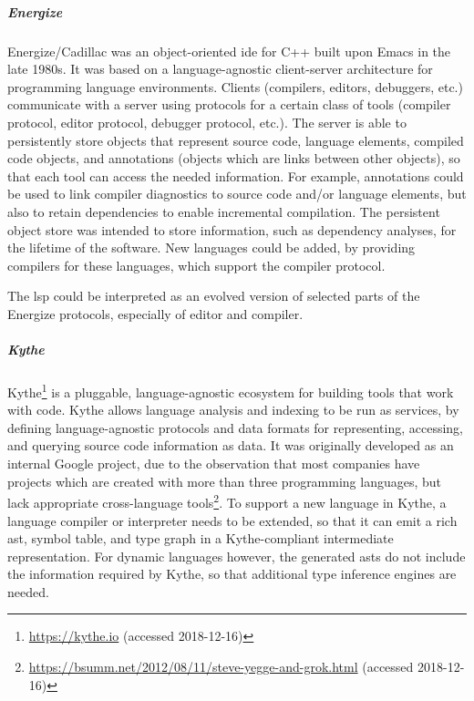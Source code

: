     
    \subparagraph{Energize}
    Energize/Cadillac \cite{gabriel1990foundation} was an object-oriented \ac{ide} for C++ built upon Emacs in the late 1980s. It was based on a language-agnostic client-server architecture for programming language environments. Clients (compilers, editors, debuggers, etc.) communicate with a server using protocols for a certain class of tools (compiler protocol, editor protocol, debugger protocol, etc.). The server is able to persistently store objects that represent source code, language elements, compiled code objects, and annotations (objects which are links between other objects), so that each tool can access the needed information. For example, annotations could be used to link compiler diagnostics to source code and/or language elements, but also to retain dependencies to enable incremental compilation. The persistent object store was intended to store information, such as dependency analyses, for the lifetime of the software. New languages could be added, by providing compilers for these languages, which support the compiler protocol.
    
    The \ac{lsp} could be interpreted as an evolved version of selected parts of the Energize protocols, especially of editor and compiler.
   

    \subparagraph{Kythe}
    Kythe\footnote{\url{https://kythe.io} (accessed 2018-12-16)} is a pluggable, language-agnostic ecosystem for building tools that work with code. Kythe allows language analysis and indexing to be run as services, by defining language-agnostic protocols and data formats for representing, accessing, and querying source code information as data. It was originally developed as an internal Google project, due to the observation that most companies have projects which are created with more than three programming languages, but lack appropriate cross-language tools\footnote{\url{https://bsumm.net/2012/08/11/steve-yegge-and-grok.html} (accessed 2018-12-16)}. To support a new language in Kythe, a language compiler or interpreter needs to be extended, so that it can emit a rich \ac{ast}, symbol table, and type graph in a Kythe-compliant intermediate representation. For dynamic languages however, the generated \acp{ast} do not include the information required by Kythe, so that additional type inference engines are needed.

